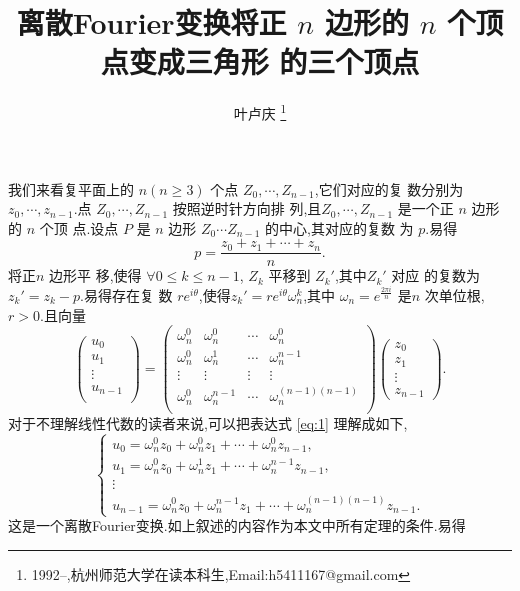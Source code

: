 \documentclass[a4paper]{article}
\begin{document}
\title{{\huge{\bf{离散Fourier变换将正 $n$ 边形的 $n$ 个顶点变成三角形
        的三个顶点}}}}\author{叶卢庆
  \footnote{1992--,杭州师范大学在读本科生,Email:h5411167@gmail.com}}
\maketitle
我们来看复平面上的 $n(n\geq 3)$ 个点 $Z_0,\cdots,Z_{n-1}$,它们对应的复
数分别为$z_0,\cdots,z_{n-1}$.点 $Z_0,\cdots,Z_{n-1}$ 按照逆时针方向排
列,且$Z_0,\cdots,Z_{n-1}$ 是一个正 $n$ 边形的 $n$ 个顶
点.设点 $P$ 是 $n$ 边形 $Z_0\cdots Z_{n-1}$ 的中心,其对应的复数
为 $p$.易得 $$p=\frac{z_0+z_1+\cdots+z_n}{n}.$$将正$n$ 边形平
移,使得 $\forall 0\leq k\leq n-1$, $Z_k$ 平移到 $Z_k'$,其中$Z_k'$ 对应
的复数为 $z_k'=z_k-p$.易得存在复
数 $re^{i\theta}$,使得$z_k'=re^{i\theta}\omega_n^k$,其中
$\omega_n=e^{\frac{2\pi i}{n}}$ 是$n$ 次单位根,$r>0$.且向量
\begin{equation}
  \label{eq:1}\begin{pmatrix}
    u_0\\
    u_1\\
    \vdots\\
    u_{n-1}\\
  \end{pmatrix}=
  \begin{pmatrix}
    \omega_n^0 &\omega_n^0&\cdots&\omega_n^0\\
    \omega_n^0&\omega_n^1&\cdots&\omega_n^{n-1}\\
    \vdots&\vdots&\vdots&\vdots\\
    \omega_n^0&\omega_n^{n-1}&\cdots&\omega_n^{(n-1)(n-1)}\\
  \end{pmatrix}\begin{pmatrix}
    z_0\\
    z_1\\
    \vdots\\
    z_{n-1}
  \end{pmatrix}.
\end{equation}
对于不理解线性代数的读者来说,可以把表达式 \eqref{eq:1} 理解成如下,
$$
\begin{cases}
  u_0=\omega_n^0z_0+\omega_n^0z_1+\cdots+\omega_n^0z_{n-1},\\
  u_1=\omega_n^0z_0+\omega_n^1z_1+\cdots+\omega_n^{n-1}z_{n-1},\\
  \vdots\\
  u_{n-1}=\omega_n^0z_0+\omega_n^{n-1}z_1+\cdots+\omega_n^{(n-1)(n-1)}z_{n-1}.
\end{cases}
$$
这是一个离散Fourier变换.如上叙述的内容作为本文中所有定理的条件.易得
\end{document}

